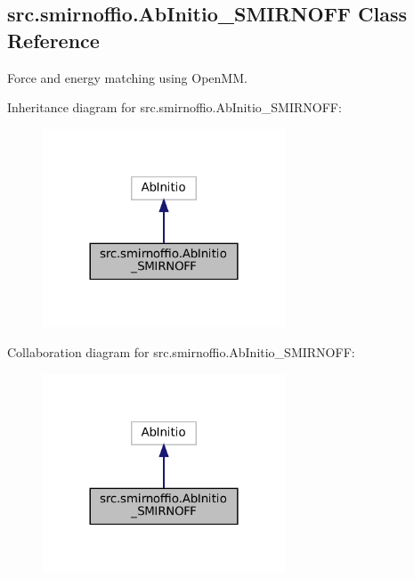 \hypertarget{classsrc_1_1smirnoffio_1_1AbInitio__SMIRNOFF}{}\subsection{src.\+smirnoffio.\+Ab\+Initio\+\_\+\+S\+M\+I\+R\+N\+O\+FF Class Reference}
\label{classsrc_1_1smirnoffio_1_1AbInitio__SMIRNOFF}


Force and energy matching using Open\+MM.  




Inheritance diagram for src.\+smirnoffio.\+Ab\+Initio\+\_\+\+S\+M\+I\+R\+N\+O\+FF\+:
\nopagebreak
\begin{figure}[H]
\begin{center}
\leavevmode
\includegraphics[width=204pt]{classsrc_1_1smirnoffio_1_1AbInitio__SMIRNOFF__inherit__graph}
\end{center}
\end{figure}


Collaboration diagram for src.\+smirnoffio.\+Ab\+Initio\+\_\+\+S\+M\+I\+R\+N\+O\+FF\+:
\nopagebreak
\begin{figure}[H]
\begin{center}
\leavevmode
\includegraphics[width=204pt]{classsrc_1_1smirnoffio_1_1AbInitio__SMIRNOFF__coll__graph}
\end{center}
\end{figure}
